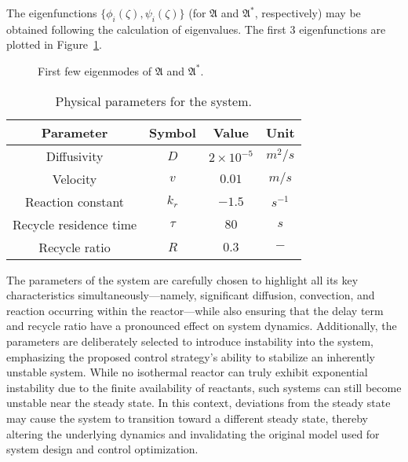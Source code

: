 The eigenfunctions $\{ {\phi_i}(\zeta), {\psi_i}(\zeta) \}$ (for $\mathfrak{A}$ and $\mathfrak{A}^*$, respectively) may be obtained following the calculation of eigenvalues. The first 3 eigenfunctions are plotted in Figure~\ref{fig:eigfun}. 

\begin{figure}[H]
    \centering
    
    \caption{First few eigenmodes of $\mathfrak{A}$ and $\mathfrak{A}^*$.}
    \label{fig:eigfun}
\end{figure}

\begin{table}[ht]
    \centering
    \caption{Physical parameters for the system.}
    \label{tab:pars_cjce1}
    \begin{tabular}{|c|c|c|c|}
    \hline
    \textbf{Parameter}        & \textbf{Symbol} & \textbf{Value}     & \textbf{Unit}    \\ \hline
    Diffusivity               & $D$             & $2\times10^{-5}$   & ${m^2}/{s}$      \\ \hline
    Velocity                  & $v$             & $0.01$   & ${m}/{s}$        \\ \hline
    Reaction constant         & $k_r$           & $-1.5$              & $s^{-1}$         \\ \hline
    Recycle residence time    & $\tau$          & $80$               & $s$              \\ \hline
    Recycle ratio             & $R$             & $0.3$              & $-$              \\ \hline
    \end{tabular}
\end{table}

The parameters of the system are carefully chosen to highlight all its key characteristics simultaneously—namely, significant diffusion, convection, and reaction occurring within the reactor—while also ensuring that the delay term and recycle ratio have a pronounced effect on system dynamics. Additionally, the parameters are deliberately selected to introduce instability into the system, emphasizing the proposed control strategy's ability to stabilize an inherently unstable system. While no isothermal reactor can truly exhibit exponential instability due to the finite availability of reactants, such systems can still become unstable near the steady state. In this context, deviations from the steady state may cause the system to transition toward a different steady state, thereby altering the underlying dynamics and invalidating the original model used for system design and control optimization.

